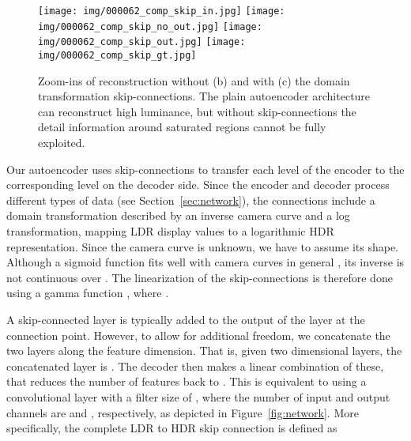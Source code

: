 \documentclass[acmtog]{acmart}
\newcommand{\figref}[1]{Figure~\ref{fig:#1}}
\newcommand{\secref}[1]{Section~\ref{sec:#1}}
\newcommand\belowfigspace{-2pt}
\begin{document}
\begin{figure}[t]
	\vspace{5pt}
	\newcommand\ww{0.116}
	\centering
	\texttt{[image: img/000062\_comp\_skip\_in.jpg]}
	\texttt{[image: img/000062\_comp\_skip\_no\_out.jpg]}
	\texttt{[image: img/000062\_comp\_skip\_out.jpg]}
	\texttt{[image: img/000062\_comp\_skip\_gt.jpg]}\\
	\vspace{-2pt}
	\vspace{-10pt}
	\caption{\label{fig:skip} Zoom-ins of reconstruction without (b) and with (c) the domain transformation skip-connections. The plain autoencoder architecture can reconstruct high luminance, but without skip-connections the detail information around saturated regions cannot be fully exploited.}
	\vspace{\belowfigspace}
\end{figure}

Our autoencoder uses skip-connections to transfer each level of the encoder to the corresponding level on the decoder side. Since the encoder and decoder process different types of data (see \secref{network}), the connections include a domain transformation described by an inverse camera curve and a log transformation, mapping LDR display values to a logarithmic HDR representation. Since the camera curve is unknown, we have to assume its shape. Although a sigmoid function fits well with camera curves in general \cite{Grossberg2003}, its inverse is not continuous over . The linearization of the skip-connections is therefore done using a gamma function , where .

A skip-connected layer is typically added to the output of the layer at the connection point. However, to allow for additional freedom, we concatenate the two layers along the feature dimension. That is, given two  dimensional layers, the concatenated layer is . The decoder then makes a linear combination of these, that reduces the number of features back to . This is equivalent to using a convolutional layer with a filter size of , where the number of input and output channels are  and , respectively, as depicted in \figref{network}. More specifically, the complete LDR to HDR skip connection is defined as
\end{document}
